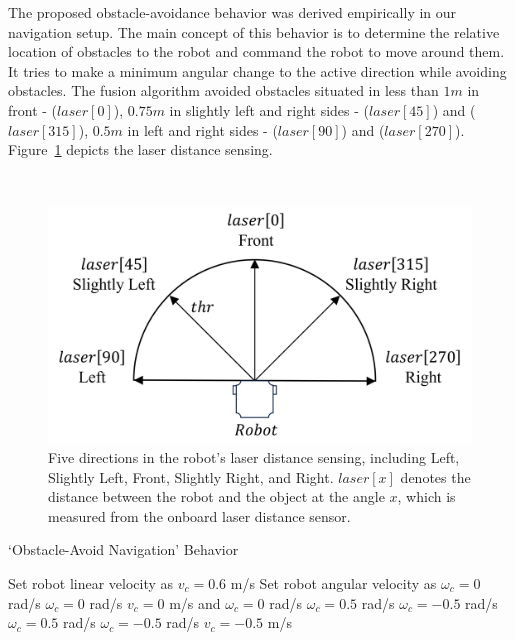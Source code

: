 The proposed obstacle-avoidance behavior was derived empirically in our navigation setup. The main concept of this behavior is to determine the relative location of obstacles to the robot and command the robot to move around them. It tries to make a minimum angular change to the active direction while avoiding obstacles. The fusion algorithm avoided obstacles situated in less than $1 m$ in front - ($laser[0]$), $0.75 m$ in slightly left and right sides - ($laser[45]$) and ($laser[315]$), $0.5 m$ in left and right sides - ($laser[90]$) and ($laser[270]$). Figure~\ref{fig:laser_distance_sensing} depicts the laser distance sensing. 

\begin{figure}[h!] %

\ \\
\vspace*{-.18in}

\begin{center}
\includegraphics[width=0.7\columnwidth]{Main/Figure/robot_laserReadings.png}\hspace*{0.04in}
\end{center}
\vspace{-.1in}

\caption
{Five directions in the robot's laser distance sensing, including Left, Slightly Left, Front, Slightly Right, and Right. $laser[x]$ denotes the distance between the robot and the object at the angle $x$, which is measured from the onboard laser distance sensor.}
\label{fig:laser_distance_sensing}
\end{figure}


\begin{algorithm}[h!]
\caption{`Obstacle-Avoid Navigation' Behavior}\label{alg:obstacle-avoid}
\begin{algorithmic}[1]
\State Set robot linear velocity as $v_c=0.6$ m/s
\State Set robot angular velocity as $\omega_c=0$ rad/s
    \State $\omega_{c}=0$ rad/s
\Else
    \State $v_c=0$ m/s and $\omega_{c}=0$ rad/s
            \State $\omega_{c}=0.5$ rad/s
        \Else
            \State $\omega_{c}=-0.5$ rad/s
        \EndIf
            \State $\omega_{c}=0.5$ rad/s
        \Else
            \State $\omega_{c}=-0.5$ rad/s
        \EndIf
    \Else
        \State $v_c=-0.5$ m/s
    \EndIf
\EndIf

\end{algorithmic}
\end{algorithm}

